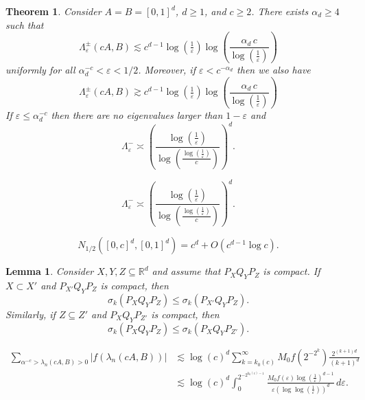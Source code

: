 \documentclass[10pt,a4paper]{amsart}
\newtheorem{theorem}{Theorem}
\newtheorem{lemma}{Lemma}
\newcommand{\R}{\mathbb{R}}
\newcommand{\eps}{\varepsilon}
\begin{document}
\begin{theorem}\label{two cubes}
Consider $A = B = [0, 1]^d$, $d\geq 1$, and $c\geq 2$. There exists $\alpha_d \geq 4$ such that
\begin{equation}\label{Lambda pm, upper, two cubes}
\Lambda_\eps^{\pm}(c A, B) \lesssim c^{d-1} \log(\tfrac{1}{\eps}) \log\left(\frac{\alpha_d \, c}{\log\left(\tfrac{1}{\eps}\right)}\right)
\end{equation}
uniformly for all $\alpha_d^{-c}< \eps < 1/2$. Moreover, if $\eps < c^{-\alpha_d}$ then we also have
\begin{equation}\label{Lambda pm, lower, two cubes}
\Lambda_\eps^{\pm}(c A, B) \gtrsim c^{d-1} \log(\tfrac{1}{\eps}) \log\left(\frac{\alpha_d \, c}{\log\left(\tfrac{1}{\eps}\right)}\right)
\end{equation}
If $\eps \leq \alpha_d^{-c}$ then there are no eigenvalues larger than $1-\eps$ and 
\begin{equation}\label{Lambda -, equivalence, two cubes}
\Lambda_\eps^- \asymp \left( \frac{\log(\tfrac{1}{\eps})}{\log \left(\tfrac{\log\left(\frac{1}{\eps}\right)}{c}\right)}\right)^d.
\end{equation}
\end{theorem}

\begin{equation}
\Lambda_\eps^- \asymp \left( \frac{\log(\tfrac{1}{\eps})}{\log \left(\tfrac{\log\left(\frac{1}{\eps}\right)}{c}\right)}\right)^d.
\end{equation}

\begin{equation}\label{N 1/2}
N_{1/2}([0,c]^d,[0,1]^d) = c^d +O(c^{d-1}\log c).
\end{equation}

\begin{lemma}\label{enlargement}
Consider $X, Y, Z \subseteq \R^d$ and assume that $P_X Q_Y P_Z$ is compact. If $X\subset X'$ and $P_{X'}Q_Y P_Z$ is compact, then
\[
\sigma_k(P_X Q_Y P_Z) \leq \sigma_k(P_{X'} Q_Y P_Z).
\]
Similarly, if $Z\subseteq Z'$ and $P_X Q_Y P_{Z'}$ is compact, then 
\[
\sigma_k(P_X Q_Y P_Z) \leq \sigma_k(P_{X} Q_Y P_{Z'}).
\]
\end{lemma}

\begin{equation}\label{trace class condition bound}
\begin{aligned}\sum_{\alpha^{-c}>\lambda_n(cA,B) >0}|f(\lambda_n(cA,B))| &\lesssim \log(c)^d\sum_{k=k_0(c)}^\infty  M_0 f\left(2^{-2^k}\right) \frac{2^{(k+1)d}}{(k+1)^d}\\
&\lesssim \log(c)^d\int_0^{2^{-2^{k_0(c)-1}}}\frac{M_0 f(\eps)\log\left(\frac{1}{\eps}\right)^{d-1}}{\eps \left(\log\log\left(\frac{1}{\eps}\right)\right)^d} \, d\eps.
\end{aligned}
\end{equation}
\end{document}
